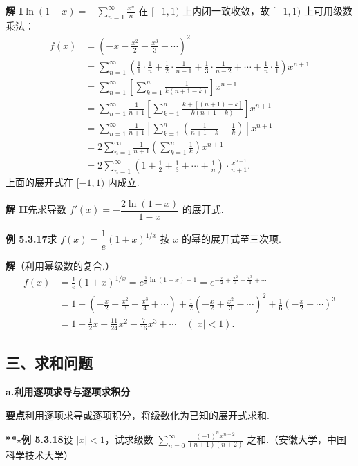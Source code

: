 \documentclass[UTF8, 12pt, fontset=fandol, oneside]{ctexart}
\begin{document}
\noindent\textbf{解 I}\quad $\displaystyle\ln(1-x)=-\sum_{n=1}^{\infty}\frac{x^n}{n}$ 在 $[-1,1)$ 上内闭一致收敛，故 $[-1,1)$ 上可用级数乘法：
\[
\begin{aligned}
f(x)
&=\left(-x-\frac{x^2}{2}-\frac{x^3}{3}-\cdots\right)^2\\
&=\sum_{n=1}^{\infty}\left(\frac11\cdot\frac1n+\frac12\cdot\frac1{n-1}
+\frac13\cdot\frac1{n-2}+\cdots+\frac1n\cdot\frac11\right)x^{n+1}\\
&=\sum_{n=1}^{\infty}\left[\sum_{k=1}^n\frac1{k(n+1-k)}\right]x^{n+1}\\
&=\sum_{n=1}^{\infty}\frac1{n+1}\left[\sum_{k=1}^n
\frac{k+[(n+1)-k]}{k(n+1-k)}\right]x^{n+1}\\
&=\sum_{n=1}^{\infty}\frac1{n+1}\left[\sum_{k=1}^n
\left(\frac1{n+1-k}+\frac1k\right)\right]x^{n+1}\\
&=2\sum_{n=1}^{\infty}\frac1{n+1}\left(\sum_{k=1}^n\frac1k\right)x^{n+1}\\
&=2\sum_{n=1}^{\infty}\left(1+\frac12+\frac13+\cdots+\frac1n\right)\cdot\frac{x^{n+1}}{n+1}.
\end{aligned}
\]
上面的展开式在 $[-1,1)$ 内成立.

\noindent\textbf{解 II}\quad 先求导数
$f'(x)=-\dfrac{2\ln(1-x)}{1-x}$ 的展开式.

\noindent\textbf{例 5.3.17}\quad 求 $f(x)=\dfrac1e(1+x)^{1/x}$ 按 $x$ 的幂的展开式至三次项.

\noindent\textbf{解}\quad （利用幂级数的复合.）
\[
\begin{aligned}
f(x)
&=\frac1e(1+x)^{1/x}
=e^{\frac1x\ln(1+x)-1}
=e^{-\frac x2+\frac{x^2}3-\frac{x^3}4+\cdots}\\
&=1+\left(-\frac x2+\frac{x^2}3-\frac{x^3}4+\cdots\right)
+\frac12\left(-\frac x2+\frac{x^2}3-\cdots\right)^2
+\frac16\left(-\frac x2+\cdots\right)^3\\
&=1-\frac12x+\frac{11}{24}x^2-\frac7{16}x^3+\cdots\quad(|x|<1).
\end{aligned}
\]

\subsection*{三、求和问题}

\noindent\textbf{a.\quad 利用逐项求导与逐项求积分}

\noindent\textbf{要点}\quad 利用逐项求导或逐项积分，将级数化为已知的展开式求和.

\noindent\textbf{**}\(\star\)\textbf{例 5.3.18}\quad 设 $|x|<1$，试求级数
$\displaystyle\sum_{n=0}^{\infty}\frac{(-1)^nx^{n+2}}{(n+1)(n+2)}$ 之和.（安徽大学，中国科学技术大学）
\end{document}
